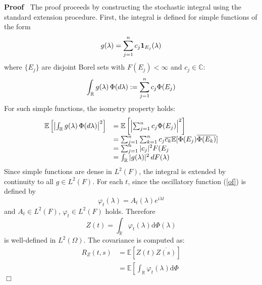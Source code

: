 \documentclass{article}
\newcommand{\assign}{:=}
\newcommand{\mathd}{\mathrm{d}}
\newcommand{\tmtextbf}[1]{\text{{\bfseries{#1}}}}
\newenvironment{proof}{\noindent\textbf{Proof\ }}{\hspace*{\fill}$\Box$\medskip}
\begin{document}
\begin{proof}
  The proof proceeds by constructing the stochastic integral using the
  standard extension procedure. First, the integral is defined for simple
  functions of the form
  \begin{equation}
    g (\lambda) = \sum_{j = 1}^n c_j \text{\tmtextbf{1}}_{E_j} (\lambda)
  \end{equation}
  where $\{E_j \}$ are disjoint Borel sets with $F (E_j) < \infty$ and $c_j
  \in \mathbb{C}$:
  \begin{equation}
    \int_{\mathbb{R}} g (\lambda)  \hspace{0.17em} \Phi (d \lambda) \assign
    \sum_{j = 1}^n c_j \Phi (E_j)
  \end{equation}
  For such simple functions, the isometry property holds:
  \begin{equation}
    \begin{array}{ll}
      \mathbb{E} \left[ \left| \int_{\mathbb{R}} g (\lambda) \hspace{0.17em}
      \Phi (d \lambda) \right|^2 \right] & =\mathbb{E} \left[ \left| \sum_{j =
      1}^n c_j \Phi (E_j) \right|^2 \right]\\
      & = \sum_{j = 1}^n \sum_{k = 1}^n c_j \overline{c_k} \mathbb{E} [\Phi
      (E_j) \overline{\Phi (E_k)}]\\
      & = \sum_{j = 1}^n |c_j |^2 F (E_j\\
      & = \int_{\mathbb{R}} |g (\lambda) |^2  \hspace{0.17em} dF (\lambda)
    \end{array}
  \end{equation}
  Since simple functions are dense in $L^2 (F)$, the integral is extended by
  continuity to all $g \in L^2 (F)$. For each $t$, since the oscillatory
  function (\ref{of}) is defined by
  \begin{equation}
    \varphi_t (\lambda) = A_t (\lambda) e^{i \lambda t}
  \end{equation}
  and $A_t \in L^2 (F)$, $\varphi_t \in L^2 (F)$ holds. Therefore
  \begin{equation}
    Z (t) = \int_{\mathbb{R}} \varphi_t (\lambda) \mathd \Phi (\lambda)
  \end{equation}
  is well-defined in $L^2 (\Omega)$. The covariance is computed as:
  \begin{equation}
    \begin{array}{ll}
      R_Z (t, s) & =\mathbb{E} [Z (t) \overline{Z (s)}]\\
      & =\mathbb{E} \left[ \int_{\mathbb{R}} \varphi_t (\lambda) \mathd \Phi

\end{array}
\end{equation}
\end{proof}
\end{document}
